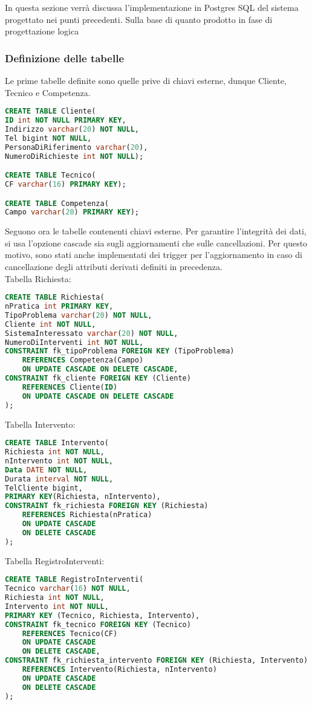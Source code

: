 \documentclass{article}
\begin{document}
In questa sezione verrà discussa l'implementazione in Postgres SQL del sistema progettato nei punti precedenti.
Sulla base di quanto prodotto in fase di progettazione logica 

\subsubsection{Definizione delle tabelle}

Le prime tabelle definite sono quelle prive di chiavi esterne, dunque Cliente, Tecnico e Competenza.

\lstset{style=SQL_CODE}

\begin{lstlisting}[language=SQL]
CREATE TABLE Cliente(
ID int NOT NULL PRIMARY KEY,
Indirizzo varchar(20) NOT NULL,
Tel bigint NOT NULL,
PersonaDiRiferimento varchar(20),
NumeroDiRichieste int NOT NULL);

CREATE TABLE Tecnico(
CF varchar(16) PRIMARY KEY);

CREATE TABLE Competenza(
Campo varchar(20) PRIMARY KEY);
\end{lstlisting}

Seguono ora le tabelle contenenti chiavi esterne. Per garantire l'integrità dei dati, si usa l'opzione cascade sia sugli aggiornamenti che sulle cancellazioni. Per questo motivo, sono stati anche implementati dei trigger per l'aggiornamento in caso di cancellazione degli attributi derivati definiti in precedenza.\\
Tabella Richiesta:
\begin{lstlisting}[language=SQL]
CREATE TABLE Richiesta(
nPratica int PRIMARY KEY,
TipoProblema varchar(20) NOT NULL,
Cliente int NOT NULL,
SistemaInteressato varchar(20) NOT NULL,
NumeroDiInterventi int NOT NULL,
CONSTRAINT fk_tipoProblema FOREIGN KEY (TipoProblema) 
	REFERENCES Competenza(Campo) 
	ON UPDATE CASCADE ON DELETE CASCADE,
CONSTRAINT fk_cliente FOREIGN KEY (Cliente) 
	REFERENCES Cliente(ID)
	ON UPDATE CASCADE ON DELETE CASCADE
);
\end{lstlisting}
Tabella Intervento:
\begin{lstlisting}[language=SQL]
CREATE TABLE Intervento(
Richiesta int NOT NULL,
nIntervento int NOT NULL,
Data DATE NOT NULL,
Durata interval NOT NULL,
TelCliente bigint,
PRIMARY KEY(Richiesta, nIntervento),
CONSTRAINT fk_richiesta FOREIGN KEY (Richiesta) 
	REFERENCES Richiesta(nPratica)
	ON UPDATE CASCADE
	ON DELETE CASCADE
);
\end{lstlisting}
Tabella RegistroInterventi:
\begin{lstlisting}[language=SQL]
CREATE TABLE RegistroInterventi(
Tecnico varchar(16) NOT NULL,
Richiesta int NOT NULL,
Intervento int NOT NULL,
PRIMARY KEY (Tecnico, Richiesta, Intervento),
CONSTRAINT fk_tecnico FOREIGN KEY (Tecnico) 
	REFERENCES Tecnico(CF)
	ON UPDATE CASCADE
	ON DELETE CASCADE,
CONSTRAINT fk_richiesta_intervento FOREIGN KEY (Richiesta, Intervento) 
	REFERENCES Intervento(Richiesta, nIntervento)
	ON UPDATE CASCADE
	ON DELETE CASCADE
);
\end{lstlisting}
\end{document}
